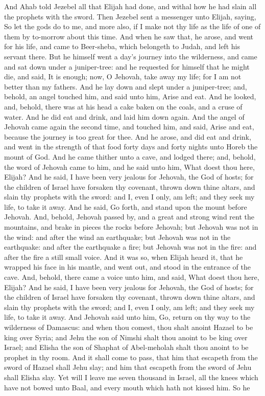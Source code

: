 And Ahab told Jezebel all that Elijah had done, and withal how he had slain all the prophets with the sword. Then Jezebel sent a messenger unto Elijah, saying, So let the gods do to me, and more also, if I make not thy life as the life of one of them by to-morrow about this time. And when he saw that, he arose, and went for his life, and came to Beer-sheba, which belongeth to Judah, and left his servant there. But he himself went a day’s journey into the wilderness, and came and sat down under a juniper-tree: and he requested for himself that he might die, and said, It is enough; now, O Jehovah, take away my life; for I am not better than my fathers. And he lay down and slept under a juniper-tree; and, behold, an angel touched him, and said unto him, Arise and eat. And he looked, and, behold, there was at his head a cake baken on the coals, and a cruse of water. And he did eat and drink, and laid him down again. And the angel of Jehovah came again the second time, and touched him, and said, Arise and eat, because the journey is too great for thee. And he arose, and did eat and drink, and went in the strength of that food forty days and forty nights unto Horeb the mount of God.  And he came thither unto a cave, and lodged there; and, behold, the word of Jehovah came to him, and he said unto him, What doest thou here, Elijah? And he said, I have been very jealous for Jehovah, the God of hosts; for the children of Israel have forsaken thy covenant, thrown down thine altars, and slain thy prophets with the sword: and I, even I only, am left; and they seek my life, to take it away. And he said, Go forth, and stand upon the mount before Jehovah. And, behold, Jehovah passed by, and a great and strong wind rent the mountains, and brake in pieces the rocks before Jehovah; but Jehovah was not in the wind: and after the wind an earthquake; but Jehovah was not in the earthquake: and after the earthquake a fire; but Jehovah was not in the fire: and after the fire a still small voice. And it was so, when Elijah heard it, that he wrapped his face in his mantle, and went out, and stood in the entrance of the cave. And, behold, there came a voice unto him, and said, What doest thou here, Elijah? And he said, I have been very jealous for Jehovah, the God of hosts; for the children of Israel have forsaken thy covenant, thrown down thine altars, and slain thy prophets with the sword; and I, even I only, am left; and they seek my life, to take it away.  And Jehovah said unto him, Go, return on thy way to the wilderness of Damascus: and when thou comest, thou shalt anoint Hazael to be king over Syria; and Jehu the son of Nimshi shalt thou anoint to be king over Israel; and Elisha the son of Shaphat of Abel-meholah shalt thou anoint to be prophet in thy room. And it shall come to pass, that him that escapeth from the sword of Hazael shall Jehu slay; and him that escapeth from the sword of Jehu shall Elisha slay. Yet will I leave me seven thousand in Israel, all the knees which have not bowed unto Baal, and every mouth which hath not kissed him.  So he 
